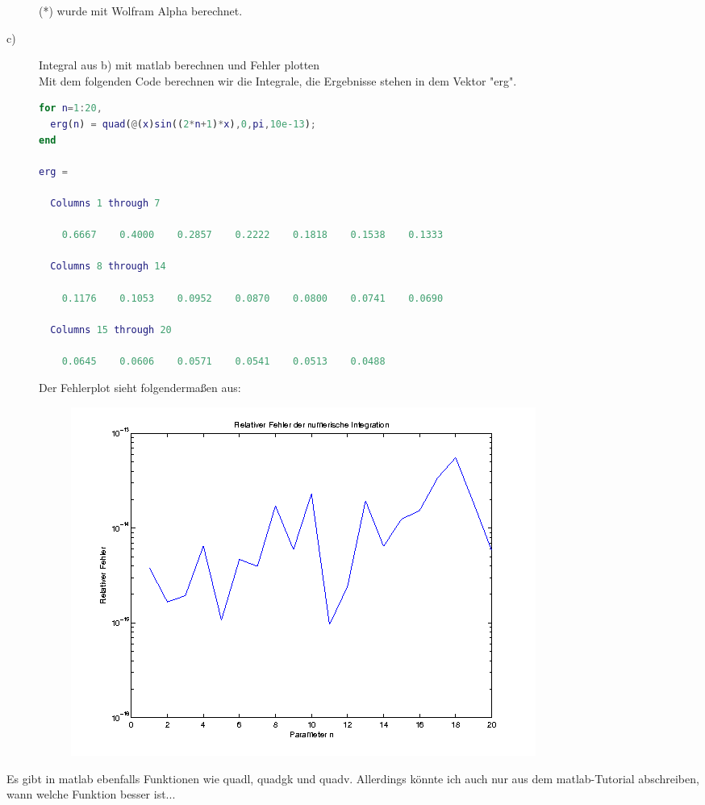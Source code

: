 \documentclass[11pt,a4paper,ngerman]{article}
\begin{document}
\begin{description}
(*) wurde mit Wolfram Alpha berechnet.

\item[c)] Integral aus b) mit matlab berechnen und Fehler plotten \\

Mit dem folgenden Code berechnen wir die Integrale, die Ergebnisse stehen in dem Vektor "erg".
\begin{lstlisting}[language=matlab]
for n=1:20,
  erg(n) = quad(@(x)sin((2*n+1)*x),0,pi,10e-13);
end

erg =

  Columns 1 through 7

    0.6667    0.4000    0.2857    0.2222    0.1818    0.1538    0.1333

  Columns 8 through 14

    0.1176    0.1053    0.0952    0.0870    0.0800    0.0741    0.0690

  Columns 15 through 20

    0.0645    0.0606    0.0571    0.0541    0.0513    0.0488
\end{lstlisting}

Der Fehlerplot sieht folgendermaßen aus:

\begin{figure}[h]
\includegraphics[scale=0.6]{fehler.png}
\end{figure}
\end{description}

Es gibt in matlab ebenfalls Funktionen wie quadl, quadgk und quadv. Allerdings könnte ich auch nur aus dem matlab-Tutorial abschreiben, wann welche Funktion besser ist...
\end{document}
